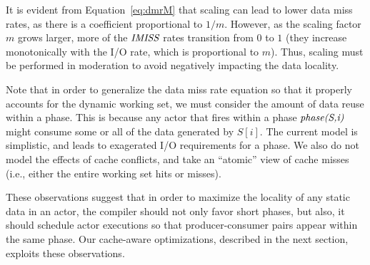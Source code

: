 It is evident from Equation~\ref{eq:dmrM} that scaling can lead to
lower data miss rates, as there is a coefficient proportional to
$1/m$.  However, as the scaling factor $m$ grows larger, more of the
$\mbox{\it IMISS}$ rates transition from $0$ to $1$ (they increase
monotonically with the I/O rate, which is proportional to $m$).  Thus,
scaling must be performed in moderation to avoid negatively impacting
the data locality.

Note that in order to generalize the data miss rate equation so that it properly
accounts for the dynamic working set, we must consider the amount of
data reuse within a phase. This is because any actor that fires within
a phase $\mbox{\it phase(S,i)}$ might consume some or all of the data
generated by $S[i]$. The current model is simplistic, and leads to
exagerated I/O requirements for a phase. We also do not model the
effects of cache conflicts, and take an ``atomic'' view of cache
misses (i.e., either the entire working set hits or misses).

These observations suggest that in order to maximize the locality of
any static data in an actor, the compiler should not only favor short
phases, but also, it should schedule actor executions so that
producer-consumer pairs appear within the same phase. Our cache-aware
optimizations, described in the next section, exploits these
observations.
